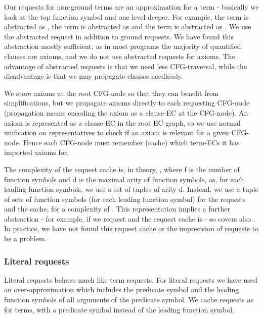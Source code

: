 Our requests for non-ground terms are an approximation for a term - basically we look at the top function symbol and one level deeper.
For example, the term  is abstracted as , the term  is abstracted as  and the term  is abstracted as . We use the abstracted request in addition to ground requests. We have found this abstraction mostly sufficient, as in most programs the majority of quantified clauses are axioms, and we do not use abstracted requests for axioms.
The advantage of abstracted requests is that we need less CFG-traversal, while the disadvantage is that we may propagate clauses needlessly.

We store axioms at the root CFG-node so that they can benefit from simplifications, 
but we propagate axioms directly to each requesting CFG-node (propagation means encoding the axiom as a clause-EC at the CFG-node).
An axiom is represented as a clause-EC in the root EC-graph, so we use normal unification on representatives to check if an axiom is relevant for a given CFG-node. Hence each CFG-node must remember (cache) which term-ECs it has imported axioms for.

The complexity of the request cache is, in theory, , where f is the number of function symbols and d is the maximal arity of function symbols, as, for each leading function symbols, we use a set of tuples of arity d. Instead, we use a tuple of sets of function symbols (for each leading function symbol) for the requests and the cache, for a complexity of . This representation implies a further abstraction - for example, if we request  and  the request cache is  - so covers also . In practice, we have not found this request cache or the imprecision of requests to be a problem.

\subsubsection*{Literal requests}
Literal requests behave much like term requests.
For literal requests we have used an over-approximation which includes the predicate symbol and the leading function symbols of all arguments of the predicate symbol. We cache requests as for terms, with a predicate symbol instead of the leading function symbol.

